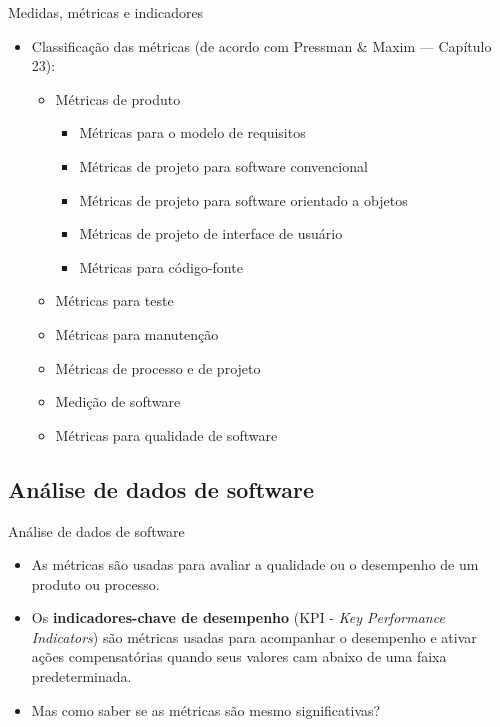 \documentclass{beamer}
\begin{document}
\begin{frame}{Medidas, métricas e indicadores}
	\begin{itemize}
		\justifying
		\item Classificação das métricas (de acordo com Pressman \& Maxim --- Capítulo 23):
			\begin{itemize}
				\item Métricas de produto
					\begin{itemize}
						\justifying
						\item Métricas para o modelo de requisitos
						\item Métricas de projeto para software convencional
						\item Métricas de projeto para software orientado a objetos
						\item Métricas de projeto de interface de usuário
						\item Métricas para código-fonte
					\end{itemize}
				\item Métricas para teste
				\item Métricas para manutenção
				\item Métricas de processo e de projeto
				\item Medição de software
				\item Métricas para qualidade de software
			\end{itemize}
	\end{itemize}
\end{frame}

\subsection{Análise de dados de software}

\begin{frame}{Análise de dados de software}
	\begin{itemize}
		\justifying
		\item As métricas são usadas para avaliar a qualidade ou o desempenho de um produto ou processo.
		\item Os \textbf{indicadores-chave de desempenho} (KPI - \textit{Key Performance Indicators}) são métricas usadas para acompanhar o desempenho e ativar ações compensatórias quando seus valores cam abaixo de uma faixa predeterminada.
		\item Mas como saber se as métricas são mesmo significativas?
	\end{itemize}
\end{frame}
\end{document}

